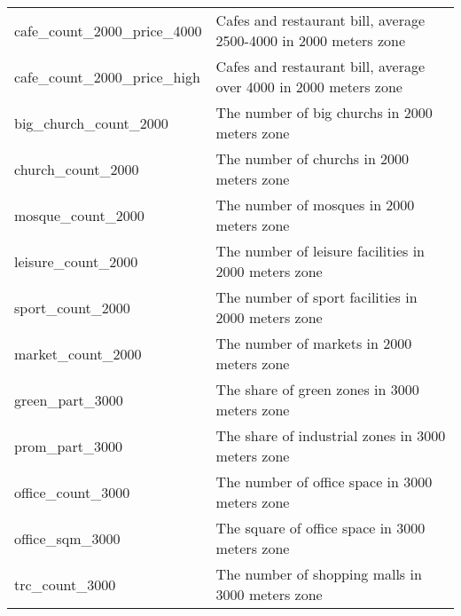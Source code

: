 \begin{longtable}[c]{ll}
    cafe\_count\_2000\_price\_4000             & Cafes and restaurant bill, average  2500-4000 in 2000 meters zone                                                         \\
    cafe\_count\_2000\_price\_high             & Cafes and restaurant bill, average  over 4000 in 2000 meters zone                                                         \\
    big\_church\_count\_2000                   & The number of big churchs in 2000 meters zone                                                                             \\
    church\_count\_2000                        & The number of churchs in 2000 meters zone                                                                                 \\
    mosque\_count\_2000                        & The number of mosques in 2000 meters zone                                                                                 \\
    leisure\_count\_2000                       & The number of leisure facilities in 2000 meters zone                                                                      \\
    sport\_count\_2000                         & The number of sport facilities in 2000 meters zone                                                                        \\
    market\_count\_2000                        & The number of markets in 2000 meters zone                                                                                 \\
    green\_part\_3000                          & The share of green zones in 3000 meters zone                                                                              \\
    prom\_part\_3000                           & The share of industrial zones in 3000 meters zone                                                                         \\
    office\_count\_3000                        & The number of office space in 3000 meters zone                                                                            \\
    office\_sqm\_3000                          & The square of office space in 3000 meters zone                                                                            \\
    trc\_count\_3000                           & The number of shopping malls in 3000 meters zone                                                                          \\

\end{longtable}
